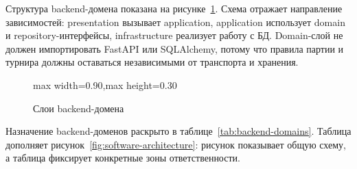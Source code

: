 Структура backend-домена показана на рисунке~\ref{fig:backend-layers}. Схема отражает направление зависимостей: presentation вызывает application, application использует domain и repository-интерфейсы, infrastructure реализует работу с БД. Domain-слой не должен импортировать FastAPI или SQLAlchemy, потому что правила партии и турнира должны оставаться независимыми от транспорта и хранения.

\begin{figure}[H]
\centering
\begin{adjustbox}{max width=0.90\textwidth,max height=0.30\textheight}
\end{adjustbox}
\caption{Слои backend-домена}\label{fig:backend-layers}
\end{figure}

Назначение backend-доменов раскрыто в таблице~\ref{tab:backend-domains}. Таблица дополняет рисунок~\ref{fig:software-architecture}: рисунок показывает общую схему, а таблица фиксирует конкретные зоны ответственности.

